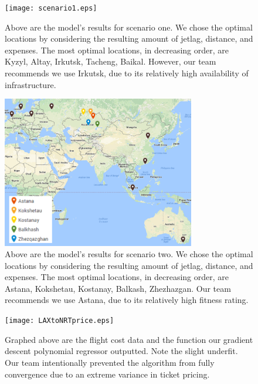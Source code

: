 \begin{figure}
	\centerline{\texttt{[image: scenario1.eps]}}
\caption{Above are the model's results for scenario one. We chose the optimal locations by considering the resulting amount of jetlag, distance, and expenses. The most optimal locations, in decreasing order, are Kyzyl, Altay, Irkutsk, Tacheng, Baikal. However, our team recommends we use Irkutsk, due to its relatively high availability of infrastructure.}
\end{figure}

\begin{figure}
	\centerline{\includegraphics[width=0.75\textwidth]{scenario2.eps}}
\caption{Above are the model's results for scenario two. We chose the optimal locations by considering the resulting amount of jetlag, distance, and expenses. The most optimal locations, in decreasing order, are Astana, Kokshetau, Kostanay, Balkash, Zhezhazgan. Our team recommends we use Astana, due to its relatively high fitness rating.}
\end{figure}


\begin{figure}
	\centerline{\texttt{[image: LAXtoNRTprice.eps]}}
\caption{Graphed above are the flight cost data and the function our gradient descent polynomial regressor outputted. Note the slight underfit. Our team intentionally prevented the algorithm from fully convergence due to an extreme variance in ticket pricing.}
\end{figure}


